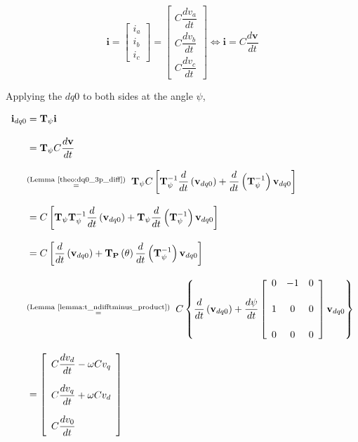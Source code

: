 \begin{equation} \mathbf{i} = 
\left[\begin{array}{c} i_a \\ i_b \\ i_c \end{array}\right] = 
\left[\begin{array}{c} C\dfrac{dv_a}{dt} \\[5mm] C\dfrac{dv_b}{dt} \\[5mm] C\dfrac{dv_c}{dt} \end{array}\right] \Leftrightarrow
 \mathbf{i} = C\dfrac{d\mathbf{v}}{dt} \end{equation}

	Applying the $dq0$ to both sides at the angle $\psi$,

\begin{align}
	\mathbf{i}_{dq0} &= \mathbf{T}_\psi \mathbf{i} \nonumber\\[3mm]
	&= \mathbf{T}_\psi C\dfrac{d\mathbf{v}}{dt} \nonumber\\[3mm] 
	&\substack{\text{(Lemma \ref{theo:dq0_3p_diff})} \\ =}\hspace{2mm} \mathbf{T}_\psi C\left[ \mathbf{T}^{-1}_\psi \dfrac{d}{dt}\left(\mathbf{v}_{dq0}\right) + \dfrac{d}{dt}\left(\mathbf{T}^{-1}_\psi \right) \mathbf{v}_{dq0} \right] \nonumber\\[3mm] 
	&= C\left[ \mathbf{T}_\psi \mathbf{T}^{-1}_\psi \dfrac{d}{dt}\left(\mathbf{v}_{dq0}\right) + \mathbf{T}_\psi \dfrac{d}{dt}\left(\mathbf{T}^{-1}_\psi \right) \mathbf{v}_{dq0} \right] \nonumber\\[3mm] 
	&= C\left[ \dfrac{d}{dt}\left(\mathbf{v}_{dq0}\right) + \mathbf{T_P}\left(\theta\right)\dfrac{d}{dt}\left(\mathbf{T}^{-1}_\psi \right) \mathbf{v}_{dq0} \right] \nonumber\\[3mm]
	&\substack{\text{(Lemma \ref{lemma:t_ndifftminus_product})} \\ =}\hspace{2mm} C\left\{ \dfrac{d}{dt}\left(\mathbf{v}_{dq0}\right) + \dfrac{d\psi}{dt} \left[\begin{array}{ccc}    0 & -1 & 0 \\[5mm] 1 & 0  & 0 \\[5mm]  0 & 0  & 0 \end{array}\right] \mathbf{v}_{dq0} \right\} \nonumber\\[3mm]
%
%
&= \left[\begin{array}{l}
        C\dfrac{dv_d}{dt} - \omega C v_q \\[5mm]
        C\dfrac{dv_q}{dt} + \omega C v_d \\[5mm]
        C\dfrac{dv_0}{dt}
\end{array}\right]
\end{align}


